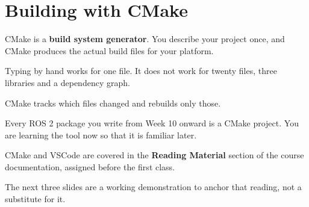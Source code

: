 \documentclass[
    10pt,
    dvipsnames,
    svgnames,
    x11names,
    aspectratio=1610,
    english,
    codeminted]{beamer}
\begin{document}
\section{Building with CMake}
\begingroup
{}
\begin{frame}
  \secdivheader{\secname}
CMake is a \textbf{build system generator}. You describe your project once, and CMake produces the actual build files for your platform.

\begin{compactitem}
    \item Typing  by hand works for one file. It does not work for twenty files, three libraries and a dependency graph.
    \item CMake tracks which files changed and rebuilds only those.
    \item Every ROS 2 package you write from Week 10 onward is a CMake project. You are learning the tool now so that it is familiar later.
\end{compactitem}

\begin{compactitem}
    \item CMake and VSCode are covered in the \textbf{Reading Material} section of the course documentation, assigned before the first class.
    \item The next three slides are a working demonstration to anchor that reading, not a substitute for it.
\end{compactitem}
\end{frame}
\endgroup

\end{document}
